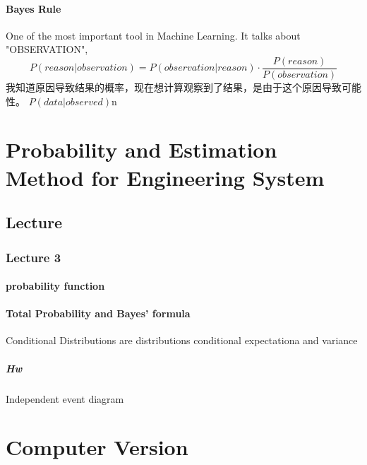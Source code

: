 \documentclass[a4paper]{article}
\begin{document}
\paragraph{Bayes Rule}
One of the most important tool in Machine Learning. It talks about "OBSERVATION",
\begin{equation}
	P(reason|observation)=P(observation|reason)\cdot \frac{P(reason)}{P(observation)}
\end{equation}
我知道原因导致结果的概率，现在想计算观察到了结果，是由于这个原因导致可能性。
\newline
$P(data|observed)$n


\section{Probability and Estimation Method for Engineering System}
\subsection{Lecture}
\subsubsection{Lecture 3}
\paragraph{probability function}
\paragraph{Total Probability and Bayes' formula}
Conditional Distributions are distributions
conditional expectationa and variance
\subparagraph{Hw}
Independent event diagram

\section{Computer Version}
\end{document}
